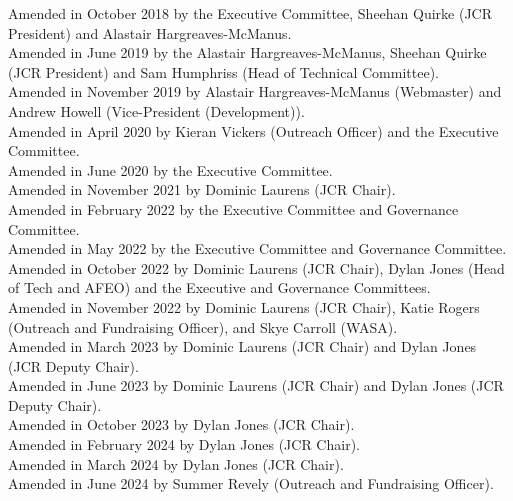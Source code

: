 \documentclass[12pt]{article}
\begin{document}
Amended in October 2018 by the Executive Committee, Sheehan Quirke (JCR President) and Alastair Hargreaves-McManus.\\
Amended in June 2019 by the Alastair Hargreaves-McManus, Sheehan Quirke (JCR President) and Sam Humphriss (Head of Technical Committee).\\
Amended in November 2019 by Alastair Hargreaves-McManus (Webmaster) and Andrew Howell (Vice-President (Development)).\\
Amended in April 2020 by Kieran Vickers (Outreach Officer) and the Executive Committee.\\
Amended in June 2020 by the Executive Committee.\\
Amended in November 2021 by Dominic Laurens (JCR Chair).\\
Amended in February 2022 by the Executive Committee and Governance Committee.\\
Amended in May 2022 by the Executive Committee and Governance Committee.\\
Amended in October 2022 by Dominic Laurens (JCR Chair), Dylan Jones (Head of Tech and AFEO) and the Executive and Governance Committees. \\
Amended in November 2022 by Dominic Laurens (JCR Chair), Katie Rogers (Outreach and Fundraising Officer), and Skye Carroll (WASA).\\
Amended in March 2023 by Dominic Laurens (JCR Chair) and Dylan Jones (JCR Deputy Chair).\\
Amended in June 2023 by Dominic Laurens (JCR Chair) and Dylan Jones (JCR Deputy Chair). \\
Amended in October 2023 by Dylan Jones (JCR Chair). \\
Amended in February 2024 by Dylan Jones (JCR Chair). \\
Amended in March 2024 by Dylan Jones (JCR Chair). \\
Amended in June 2024 by Summer Revely (Outreach and Fundraising Officer). \\

\newpage
\tableofcontents{}
\newpage
\end{document}
